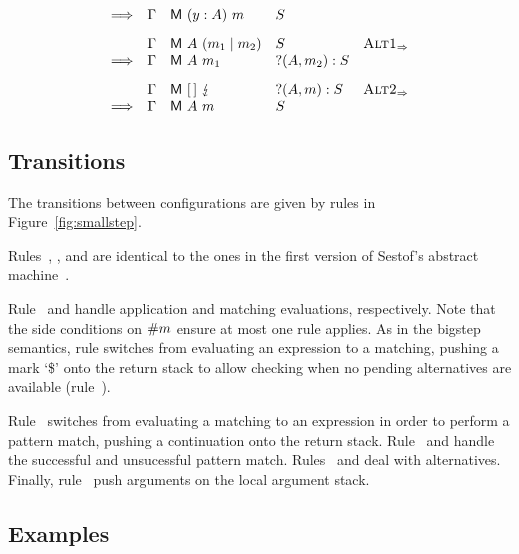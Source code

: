 \begin{figure*}
\[\begin{array}{rllll}
      \Longrightarrow & \Gamma & \textsf{M}~(y:A)~m  & S \\[2ex]
      & \Gamma & \textsf{M}~A~(m_1 \mid m_2) & S & \textsc{Alt1}_{\Rightarrow} \\
      \Longrightarrow & \Gamma & \textsf{M}~A~m_1   &?(A,m_2):S & \\[2ex]
  & \Gamma & \textsf{M}~[\,]~\lightning  & ?(A,m):S & \textsc{Alt2}_{\Rightarrow} \\
  \Longrightarrow & \Gamma & \textsf{M}~A~m  & S 
    \end{array}
  \]
    
  
  \caption{Abstract machine transition rules}\label{fig:smallstep}
\end{figure*}

\subsection{Transitions}

The transitions between configurations are given by rules in
Figure~\ref{fig:smallstep}.

Rules~, , 
and  are identical to the ones in the first version of
Sestof's abstract machine~\cite{sestof_1997}.

Rule~ and  handle application
and matching evaluations, respectively. Note that the
side conditions on $\#{m}$ ensure at most one
rule applies.
As in the bigstep semantics, rule  switches
from evaluating an expression to a
matching, pushing a mark `\$' onto the return stack
to allow checking when no pending alternatives
are available (rule~).

Rule~ switches from evaluating a matching
to an expression in order to perform a pattern match, pushing
a continuation onto the return stack.
Rule~ and  handle
the successful and unsucessful pattern match.
Rules~ and  deal
with alternatives.
Finally, rule~ push arguments on the local argument stack.

\subsection{Examples}



